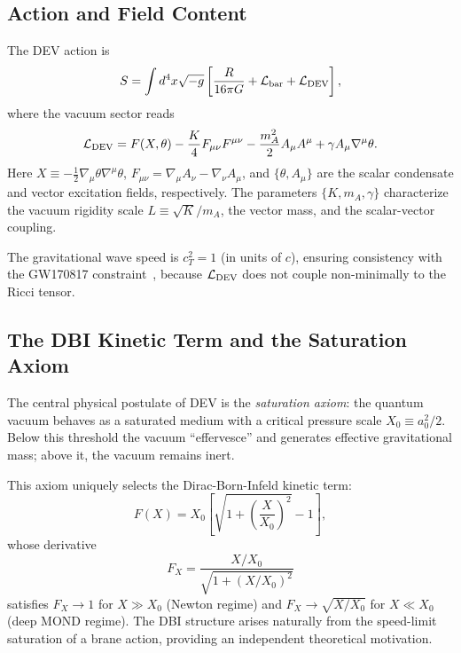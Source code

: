 \documentclass[aps,prd,twocolumn,showpacs,superscriptaddress]{revtex4-2}
\newcommand{\Lbar}{\mathcal{L}}
\newcommand{\aO}{a_0}
\newcommand{\Xzero}{X_0}
\begin{document}
\subsection{Action and Field Content}

The DEV action is
\begin{equation}
  S = \int d^4x\sqrt{-g}\left[
    \frac{R}{16\pi G}
    + \Lbar_{\rm bar}
    + \Lbar_{\rm DEV}
  \right],
  \label{eq:action}
\end{equation}
where the vacuum sector reads
\begin{equation}
  \Lbar_{\rm DEV} = F(X,\theta)
    - \frac{K}{4}F_{\mu\nu}F^{\mu\nu}
    - \frac{m_A^2}{2}A_\mu A^\mu
    + \gamma A_\mu\nabla^\mu\theta.
  \label{eq:LDEV}
\end{equation}
Here $X \equiv -\frac{1}{2}\nabla_\mu\theta\nabla^\mu\theta$,
$F_{\mu\nu} = \nabla_\mu A_\nu - \nabla_\nu A_\mu$, and
$\{\theta, A_\mu\}$ are the scalar condensate and vector excitation fields,
respectively. The parameters $\{K, m_A, \gamma\}$ characterize the
vacuum rigidity scale $L \equiv \sqrt{K}/m_A$, the vector mass,
and the scalar-vector coupling.

The gravitational wave speed is $c_T^2 = 1$ (in units of $c$),
ensuring consistency with the GW170817 constraint~\cite{GW170817},
because $\Lbar_{\rm DEV}$ does not couple non-minimally to the
Ricci tensor.

\subsection{The DBI Kinetic Term and the Saturation Axiom}

The central physical postulate of DEV is the \emph{saturation axiom}:
the quantum vacuum behaves as a saturated medium with a critical
pressure scale $\Xzero \equiv \aO^2/2$.
Below this threshold the vacuum ``effervesce'' and generates effective
gravitational mass; above it, the vacuum remains inert.

This axiom uniquely selects the Dirac-Born-Infeld kinetic term:
\begin{equation}
  F(X) = \Xzero\!\left[\sqrt{1 + \left(\frac{X}{\Xzero}\right)^{\!2}} - 1\right],
  \label{eq:DBI}
\end{equation}
whose derivative
\begin{equation}
  F_X = \frac{X/\Xzero}{\sqrt{1+(X/\Xzero)^2}}
  \label{eq:FX}
\end{equation}
satisfies $F_X \to 1$ for $X \gg \Xzero$ (Newton regime) and
$F_X \to \sqrt{X/\Xzero}$ for $X \ll \Xzero$ (deep MOND regime).
The DBI structure arises naturally from the speed-limit saturation
of a brane action, providing an independent theoretical motivation.
\end{document}
